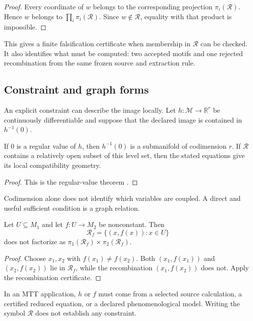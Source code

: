 \documentclass[11pt]{article}
\newcommand{\Image}{\mathcal R}
\newcommand{\Motif}{\mathcal M}
\newcommand{\R}{\mathbb R}
\begin{document}
\begin{proof}
Every coordinate of $w$ belongs to the corresponding projection
$\pi_i(\Image)$.  Hence $w$ belongs to
$\prod_i\pi_i(\Image)$.  Since $w\notin\Image$, equality with that product is
impossible.
\end{proof}

This gives a finite falsification certificate when membership in $\Image$
can be checked.  It also identifies what must be computed: two accepted
motifs and one rejected recombination from the same frozen source and
extraction rule.

\subsection{Constraint and graph forms}

An explicit constraint can describe the image locally.  Let
$h:\Motif\to\R^r$ be continuously differentiable and suppose that the
declared image is contained in $h^{-1}(0)$.

\begin{proposition}
If $0$ is a regular value of $h$, then $h^{-1}(0)$ is a submanifold of
codimension $r$.  If $\Image$ contains a relatively open subset of this
level set, then the stated equations give its local compatibility geometry.
\end{proposition}

\begin{proof}
This is the regular-value theorem \cite{lee2013}.
\end{proof}

Codimension alone does not identify which variables are coupled.  A direct
and useful sufficient condition is a graph relation.

\begin{proposition}
Let $U\subseteq M_1$ and let $f:U\to M_2$ be nonconstant.  Then
\[
  \Image_f=\{(x,f(x)):x\in U\}
\]
does not factorize as $\pi_1(\Image_f)\times\pi_2(\Image_f)$.
\end{proposition}

\begin{proof}
Choose $x_1,x_2$ with $f(x_1)\neq f(x_2)$.  Both
$(x_1,f(x_1))$ and $(x_2,f(x_2))$ lie in $\Image_f$, while the recombination
$(x_1,f(x_2))$ does not.  Apply the recombination certificate.
\end{proof}

In an MTT application, $h$ or $f$ must come from a selected source
calculation, a certified reduced equation, or a declared phenomenological
model.  Writing the symbol $\Image$ does not establish any constraint.
\end{document}
